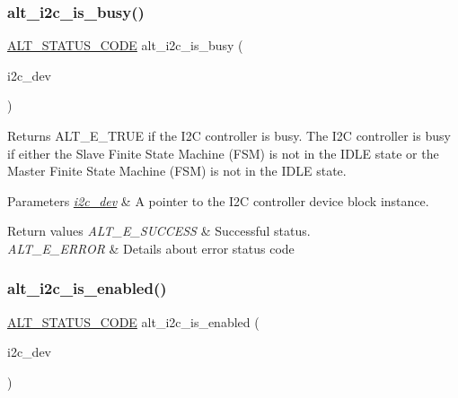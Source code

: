 \subsubsection{\texorpdfstring{alt\_i2c\_is\_busy()}{alt\_i2c\_is\_busy()}}
{\footnotesize\ttfamily \mbox{\hyperlink{hwlib_8h_abdb0d369f069723ca55d6c94bcaaaa12}{A\+L\+T\+\_\+\+S\+T\+A\+T\+U\+S\+\_\+\+C\+O\+DE}} alt\+\_\+i2c\+\_\+is\+\_\+busy (\begin{DoxyParamCaption}\item[{\mbox{\hyperlink{structALT__I2C__DEV__s}{A\+L\+T\+\_\+\+I2\+C\+\_\+\+D\+E\+V\+\_\+t}} $\ast$}]{i2c\+\_\+dev }\end{DoxyParamCaption})}

Returns A\+L\+T\+\_\+\+E\+\_\+\+T\+R\+UE if the I2C controller is busy. The I2C controller is busy if either the Slave Finite State Machine (F\+SM) is not in the I\+D\+LE state or the Master Finite State Machine (F\+SM) is not in the I\+D\+LE state.


\begin{DoxyParams}{Parameters}
{\em \mbox{\hyperlink{structi2c__dev}{i2c\+\_\+dev}}} & A pointer to the I2C controller device block instance.\\
\hline
\end{DoxyParams}

\begin{DoxyRetVals}{Return values}
{\em A\+L\+T\+\_\+\+E\+\_\+\+S\+U\+C\+C\+E\+SS} & Successful status. \\
\hline
{\em A\+L\+T\+\_\+\+E\+\_\+\+E\+R\+R\+OR} & Details about error status code \\
\hline
\end{DoxyRetVals}
\mbox{\label{group__ALT__I2C_ga766698352e55a0abdf158be06c7faed1}} 
\subsubsection{\texorpdfstring{alt\_i2c\_is\_enabled()}{alt\_i2c\_is\_enabled()}}
{\footnotesize\ttfamily \mbox{\hyperlink{hwlib_8h_abdb0d369f069723ca55d6c94bcaaaa12}{A\+L\+T\+\_\+\+S\+T\+A\+T\+U\+S\+\_\+\+C\+O\+DE}} alt\+\_\+i2c\+\_\+is\+\_\+enabled (\begin{DoxyParamCaption}\item[{\mbox{\hyperlink{structALT__I2C__DEV__s}{A\+L\+T\+\_\+\+I2\+C\+\_\+\+D\+E\+V\+\_\+t}} $\ast$}]{i2c\+\_\+dev }\end{DoxyParamCaption})}


